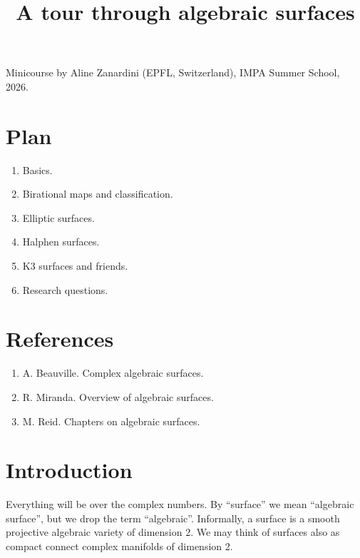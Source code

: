 


\title{A tour through algebraic surfaces}
\maketitle

\noindent
Minicourse by
Aline Zanardini
(EPFL, Switzerland),
IMPA Summer School, 2026.

\medskip\noindent

\bigskip\noindent

\tableofcontents

\section{Plan}
\label{section-plan}

\begin{enumerate}
\item Basics.
\item Birational maps and classification.
\item Elliptic surfaces.
\item Halphen surfaces.
\item K3 surfaces and friends.
\item Research questions.
\end{enumerate}

\section{References}
\label{section-references}

\begin{enumerate}
\item A. Beauville. Complex algebraic
surfaces.
\item R. Miranda. Overview of algebraic
surfaces.
\item M. Reid. Chapters on algebraic
surfaces.
\end{enumerate}

\section{Introduction}
\label{section-intro}

\noindent
Everything will be over the complex numbers.
By ``surface'' we mean ``algebraic surface'',
but we drop the term ``algebraic''.
Informally, a surface is a smooth projective
algebraic variety of dimension 2.
We may think of surfaces also as
compact connect complex manifolds of
dimension 2.

